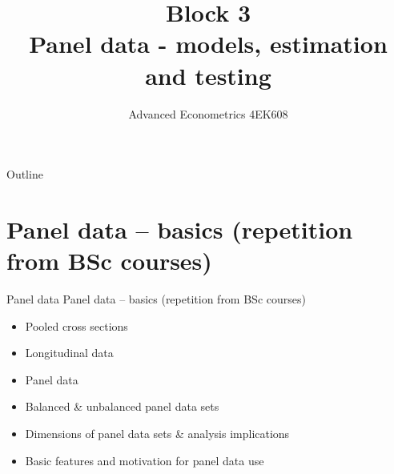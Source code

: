 \documentclass[usenames,dvipsnames]{beamer}
\title[Block 1]{Block 3 \\  Panel data - models, estimation and testing }
\author{Advanced Econometrics 4EK608}
\institute{Vysoká škola ekonomická v Praze}
\date{}
\begin{document}
 
\begin{frame}
  \titlepage
\end{frame}

\begin{frame}{Outline}
  \tableofcontents
\end{frame}
%
\section{Panel data -- basics (repetition from BSc courses)}
\begin{frame}{Panel data}
Panel data -- basics (repetition from BSc courses) \\ \bigskip
\begin{itemize}
\item Pooled cross sections
\bigskip
\item Longitudinal data
\bigskip
\item Panel data
\bigskip
\item Balanced \& unbalanced panel data sets
\bigskip
\item Dimensions of panel data sets \& analysis implications
\bigskip
\item Basic features and motivation for panel data use
\end{itemize}
\end{frame}
\end{document}
